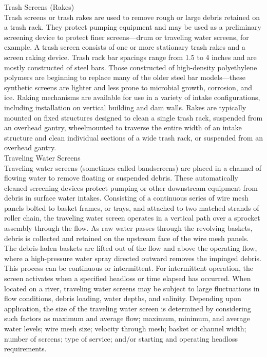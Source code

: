 \documentclass{article}
\begin{document}
Trash Screens (Rakes)\\
Trash screens or trash rakes are used to remove rough or large debris retained on a trash rack. They protect pumping equipment and may be used as a preliminary screening device to protect finer screens—drum or traveling water screens, for example. A trash screen consists of one or more stationary trash rakes and a screen raking device. Trash rack bar spacings range from 1.5 to 4 inches and are mostly constructed of steel bars. Those constructed of high-density polyethylene polymers are beginning to replace many of the older steel bar models—these synthetic screens are lighter and less prone to microbial growth, corrosion, and ice. Raking mechanisms are available for use in a variety of intake configurations, including installation on vertical building and dam walls. Rakes are typically mounted on fixed structures designed to clean a single trash rack, suspended from an overhead gantry, wheelmounted to traverse the entire width of an intake structure and clean individual sections of a wide trash rack, or suspended from an overhead gantry.\\
Traveling Water Screens\\
Traveling water screens (sometimes called bandscreens) are placed in a channel of flowing water to remove floating or suspended debris. These automatically cleaned screening devices protect pumping or other downstream equipment from debris in surface water intakes. Consisting of a continuous series of wire mesh panels bolted to basket frames, or trays, and attached to two matched strands of roller chain, the traveling water screen operates in a vertical path over a sprocket assembly through the flow. As raw water passes through the revolving baskets, debris is collected and retained on the upstream face of the wire mesh panels. The debris-laden baskets are lifted out of the flow and above the operating flow, where a high-pressure water spray directed outward removes the impinged debris. This process can be continuous or intermittent. For intermittent operation, the screen activates when a specified headloss or time elapsed has occurred. When located on a river, traveling water screens may be subject to large fluctuations in flow conditions, debris loading, water depths, and salinity. Depending upon application, the size of the traveling water screen is determined by considering such factors as maximum and average flow; maximum, minimum, and average water levels; wire mesh size; velocity through mesh; basket or channel width; number of screens; type of service; and/or starting and operating headloss requirements.\\
\end{document}
